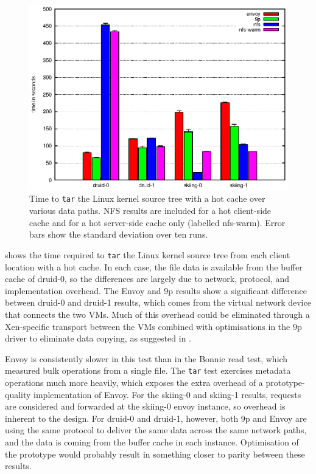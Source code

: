\begin{figure}[t]
\centering
\includegraphics[width=\figwidth]{figures/arch-tar-hot}
\caption[\texttt{tar} benchmark results with hot cache]{Time to \texttt{tar} the Linux kernel source tree with a hot cache over various data paths. NFS results are included for a hot client-side cache and for a hot server-side cache only (labelled nfs-warm). Error bars show the standard deviation over ten runs.}
\label{fig:arch-tar-hot}
\end{figure}

 shows the time required to \texttt{tar} the Linux kernel source tree from each client location with a hot cache. In each case, the file data is available from the buffer cache of druid-0, so the differences are largely due to network, protocol, and implementation overhead. The Envoy and 9p results show a significant difference between druid-0 and druid-1 results, which comes from the virtual network device that connects the two VMs. Much of this overhead could be eliminated through a Xen-specific transport between the VMs combined with optimisations in the 9p driver to eliminate data copying, as suggested in .

Envoy is consistently slower in this test than in the Bonnie read test, which measured bulk operations from a single file. The \texttt{tar} test exercises metadata operations much more heavily, which exposes the extra overhead of a prototype-quality implementation of Envoy. For the skiing-0 and skiing-1 results, requests are considered and forwarded at the skiing-0 envoy instance, so overhead is inherent to the design. For druid-0 and druid-1, however, both 9p and Envoy are using the same protocol to deliver the same data across the same network paths, and the data is coming from the buffer cache in each instance. Optimisation of the prototype would probably result in something closer to parity between these results.

